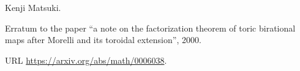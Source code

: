 Kenji Matsuki.

\newblock Erratum to the paper ``a note on the factorization theorem of toric
  birational maps after {Morelli} and its toroidal extension'', 2000.

\newblock URL \url{https://arxiv.org/abs/math/0006038}.


